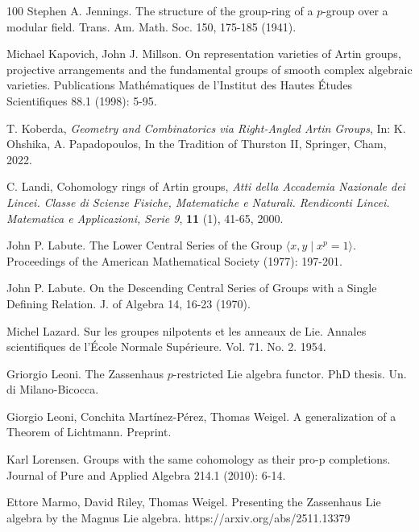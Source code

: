 \documentclass[10pt, oneside]{amsart}
\theoremstyle{definition}
\theoremstyle{remark}
\theoremstyle{plain}
\begin{document}
\begin{thebibliography}{100}
 Stephen A. Jennings. The structure of the group-ring of a $p$-group over a modular field. Trans. Am. Math. Soc. 150, 175-185 (1941). %

 Michael Kapovich, John J. Millson. On representation varieties of Artin groups, projective arrangements and the fundamental groups of smooth complex algebraic varieties. Publications Mathématiques de l'Institut des Hautes Études Scientifiques 88.1 (1998): 5-95.

    T. Koberda, \textit{Geometry and Combinatorics via Right-Angled Artin Groups}, In: K. Ohshika, A. Papadopoulos, In the Tradition of Thurston II, Springer, Cham, 2022.

    C. Landi, Cohomology rings of Artin groups, \textit{Atti della Accademia Nazionale dei Lincei. Classe di Scienze Fisiche, Matematiche e Naturali. Rendiconti Lincei. Matematica e Applicazioni, Serie 9}, \textbf{11} (1), 41-65, 2000.

 John P. Labute. The Lower Central Series of the Group $\langle x,y\mid x^p=1\rangle$. Proceedings of the American Mathematical Society (1977): 197-201.

 John P. Labute. On the Descending Central Series of Groups with a Single Defining Relation. J. of Algebra 14, 16-23 (1970).

 Michel Lazard. Sur les groupes nilpotents et les anneaux de Lie. Annales scientifiques de l'École Normale Supérieure. Vol. 71. No. 2. 1954.

 Griorgio Leoni. The Zassenhaus $p$-restricted Lie algebra functor. PhD thesis. Un. di Milano-Bicocca.

 Giorgio Leoni, Conchita Martínez-Pérez, Thomas Weigel. A generalization of a Theorem of Lichtmann. Preprint.

 Karl Lorensen. Groups with the same cohomology as their pro-p completions. Journal of Pure and Applied Algebra 214.1 (2010): 6-14.


 Ettore Marmo, David Riley, Thomas Weigel. Presenting the Zassenhaus Lie algebra by the  
Magnus Lie algebra. https://arxiv.org/abs/2511.13379



\end{thebibliography}
\end{document}
